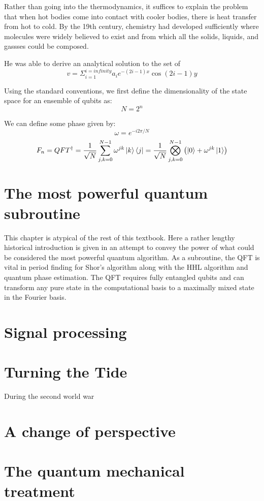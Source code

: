 \documentclass{book}
\begin{document}
Rather than going into the thermodynamics, it suffices to explain the problem that when hot bodies come into contact with cooler bodies, there is heat transfer from hot to cold. By the 19th century, chemistry had developed sufficiently where molecules were widely believed to exist and from which all the solids, liquids, and gassses could be composed. 

He was able to derive an analytical solution to the set of 
$$
v = \Sigma^{i = infinity}_{i = 1} a_ie^{-(2i-1)x}\cos(2i-1)y
$$

Using the standard conventions, we first define the dimensionality of the state space for an ensemble of qubits as: 
$$ N = 2^n $$

We can define some phase given by:
$$ \omega = e^{-i2\pi /N} $$
$$F_n = QFT^{\dagger} = \frac{1}{\sqrt{N}} \sum_{j,k = 0}^{N-1}\omega^{jk} \ket{k}\bra{j} = \frac{1}{\sqrt{N}}\bigotimes_{j,k = 0}^{N-1}\left(\ket{0} + \omega^{jk}\ket{1} \right)$$

\section{The most powerful quantum subroutine}

This chapter is atypical of the rest of this textbook. Here a rather lengthy historical introduction is given in an attempt to convey the power of what could be considered the most powerful quantum algorithm. As a subroutine, the QFT is vital in period finding for Shor's algorithm along with the HHL algorithm and quantum phase estimation. The QFT requires fully entangled qubits and can transform any pure state in the computational basis to a maximally mixed state in the Fourier basis. 

\section{Signal processing}

\section{Turning the Tide}

During the second world war 

\section{A change of perspective }
\section{The quantum mechanical treatment}
\end{document}
